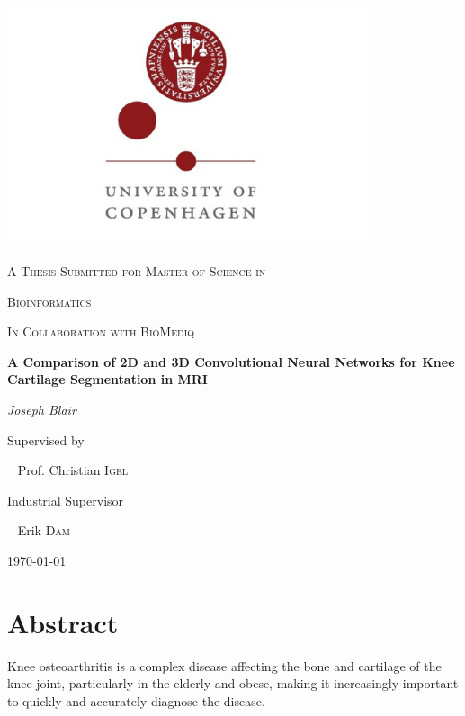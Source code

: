\documentclass[11pt,a4paper]{memoir}
\numberwithin{figure}{section}
\numberwithin{table}{section}
\numberwithin{equation}{section}
\begin{document}
\frontmatter

\thispagestyle{empty}
\begin{center}


	\includegraphics[width=0.8\textwidth]{upotrofies_uni.jpg}\par\vspace{1cm}
	{\scshape\Large A Thesis Submitted for Master of Science in \par}
        
    {\scshape\Large Bioinformatics\par}
    \vspace{0.5cm}
    {\scshape\Large In Collaboration with BioMediq\par}

	\vspace{1cm}
	{\huge\bfseries A Comparison of 2D and 3D Convolutional Neural Networks for Knee Cartilage  Segmentation in MRI  \par}
	\vspace{1.5cm}
	{\Large\itshape Joseph Blair\par}
 
	\vfill
	Supervised by\par
	~ Prof. Christian \textsc{Igel}\par
    \vfill
    Industrial Supervisor\par
    ~ Erik \textsc{Dam}
    

	\vfill

	{\large \today\par}
    \end{center}

\chapter*{Abstract}
Knee osteoarthritis is a complex disease affecting the bone and cartilage of the knee joint, particularly in the elderly and obese, making it increasingly important to quickly and accurately diagnose the disease. \\ 
\end{document}
